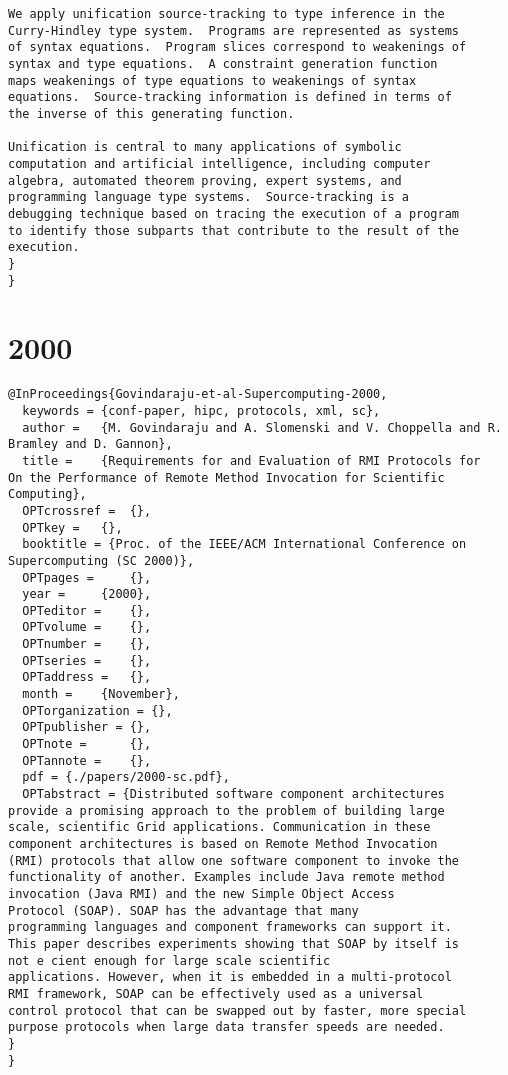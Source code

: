 \documentclass[11pt]{article}
\begin{document}
\begin{lstlisting}
We apply unification source-tracking to type inference in the
Curry-Hindley type system.  Programs are represented as systems
of syntax equations.  Program slices correspond to weakenings of
syntax and type equations.  A constraint generation function
maps weakenings of type equations to weakenings of syntax
equations.  Source-tracking information is defined in terms of
the inverse of this generating function.

Unification is central to many applications of symbolic
computation and artificial intelligence, including computer
algebra, automated theorem proving, expert systems, and
programming language type systems.  Source-tracking is a
debugging technique based on tracing the execution of a program
to identify those subparts that contribute to the result of the
execution.
}
}
\end{lstlisting}
\section{2000}
\label{sec:orgd655f94}
\lstset{language=bibtex,label= ,caption= ,captionpos=b,numbers=none}
\begin{lstlisting}
@InProceedings{Govindaraju-et-al-Supercomputing-2000,
  keywords = {conf-paper, hipc, protocols, xml, sc},
  author = 	 {M. Govindaraju and A. Slomenski and V. Choppella and R. Bramley and D. Gannon},
  title = 	 {Requirements for and Evaluation of RMI Protocols for
On the Performance of Remote Method Invocation for Scientific Computing},
  OPTcrossref =  {},
  OPTkey = 	 {},
  booktitle = {Proc. of the IEEE/ACM International Conference on Supercomputing (SC 2000)},
  OPTpages = 	 {},
  year = 	 {2000},
  OPTeditor = 	 {},
  OPTvolume = 	 {},
  OPTnumber = 	 {},
  OPTseries = 	 {},
  OPTaddress = 	 {},
  month = 	 {November},
  OPTorganization = {},
  OPTpublisher = {},
  OPTnote = 	 {},
  OPTannote = 	 {},
  pdf = {./papers/2000-sc.pdf},
  OPTabstract = {Distributed software component architectures
provide a promising approach to the problem of building large
scale, scientific Grid applications. Communication in these
component architectures is based on Remote Method Invocation
(RMI) protocols that allow one software component to invoke the
functionality of another. Examples include Java remote method
invocation (Java RMI) and the new Simple Object Access
Protocol (SOAP). SOAP has the advantage that many
programming languages and component frameworks can support it.
This paper describes experiments showing that SOAP by itself is
not e cient enough for large scale scientific
applications. However, when it is embedded in a multi-protocol
RMI framework, SOAP can be effectively used as a universal
control protocol that can be swapped out by faster, more special
purpose protocols when large data transfer speeds are needed.
}
}
\end{lstlisting}
\end{document}

